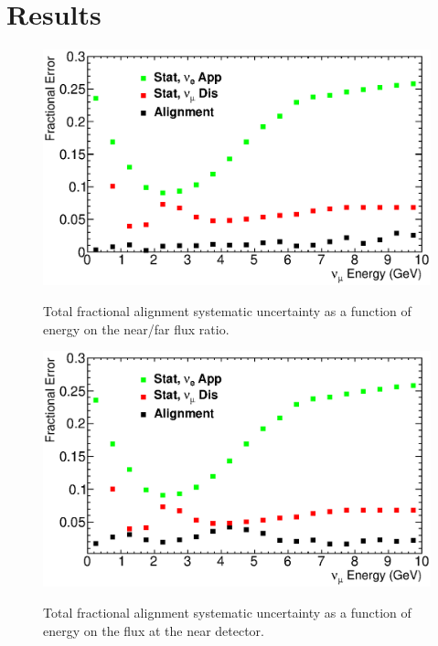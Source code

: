 \section{Results}
\label{sec:results}



\begin{figure}[ht]
  \begin{center}
    {\includegraphics[width=6.0in]{figures/tot_error_nof.eps}}
  \end{center}
\caption{ Total fractional alignment systematic uncertainty as a function of energy on the near/far flux ratio. }
\end{figure}

\begin{figure}[ht]
  \begin{center}
    {\includegraphics[width=6.0in]{figures/tot_error_near.eps}}
  \end{center}
\caption{ Total fractional alignment systematic uncertainty as a function of energy on the flux at the near detector. }
\end{figure}

